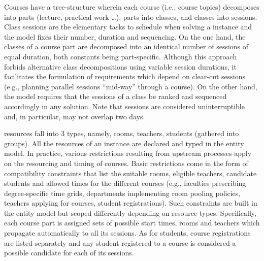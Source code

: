 Courses have a tree-structure wherein each course (i.e., course topics) decomposes into parts (lecture, practical work \ldots), parts into classes, and classes into sessions.
Class sessions are the elementary tasks to schedule when solving a {\UTP} instance
and the model fixes their number, duration and sequencing.
On the one hand, the classes of a course part are decomposed into an identical number of sessions of equal duration, both constants being part-specific.
Although this approach forbids alternative class decompositions using variable session durations, 
it %
facilitates the formulation of requirements which depend on clear-cut sessions (e.g., planning parallel sessions ``mid-way'' through a course).
On the other hand, the model requires that the sessions of a class be ranked and sequenced accordingly in any solution.
Note that sessions are considered uninterruptible and, in particular, may not overlap two days. 

{\UTP} resources fall into 3 types, namely, rooms, teachers, students (gathered into groups).
All the resources of an instance are declared and typed in the entity model.
In practice, various restrictions resulting from upstream processes apply on the resourcing and timing of courses.
Basic restrictions come in the form of compatibility constraints that list the suitable rooms, eligible teachers, candidate students and allowed times for the different courses 
(e.g., faculties prescribing degree-specific time grids, departments implementing room pooling policies, %
teachers applying for courses, student registrations). %
Such constraints are built in the entity model but scoped differently depending on resource types.
Specifically, each course part is assigned sets of possible start times, rooms and teachers which propagate automatically to all its sessions.
As for students, course registrations are listed separately and %
any student registered to a course is considered a possible candidate for each of its sessions.

